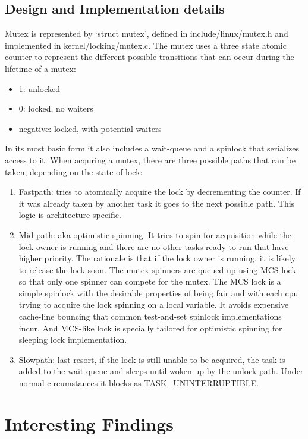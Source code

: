 \documentclass[10pt,preprint]{sigplanconf}
\begin{document}
\subsection{Design and Implementation details}
Mutex is represented by ‘struct mutex’, defined in include/linux/mutex.h and implemented in kernel/locking/mutex.c. The mutex uses a three state atomic counter to represent the different possible transitions that can occur during the lifetime of a mutex:
\begin{itemize}
	\item 1: unlocked
	\item 0: locked, no waiters
	\item negative: locked, with potential waiters
\end{itemize}
In its most basic form it also includes a wait-queue and a spinlock that serializes access to it. When acquring a mutex, there are three possible paths that can be taken, depending on the state of lock:
\begin{enumerate}
	\item Fastpath: tries to atomically acquire the lock by decrementing the counter. If it was already taken by another task it goes to the next possible path. This logic is architecture specific.
	\item Mid-path: aka optimistic spinning. It tries to spin for acquisition while the lock owner is running and there are no other tasks ready to run that have higher priority. The rationale is that if the lock owner is running, it is likely to release the lock soon. The mutex spinners are queued up using MCS lock so that only one spinner can compete for the mutex. The MCS lock is a simple spinlock with the desirable properties of being fair and with each cpu trying to acquire the lock spinning on a local variable. It avoids expensive cache-line bouncing that common test-and-set spinlock implementations incur. And MCS-like lock is specially tailored for optimistic spinning for sleeping lock implementation.
	\item Slowpath: last resort, if the lock is still unable to be acquired, the task is added to the wait-queue and sleeps until woken up by the unlock path. Under normal circumstances it blocks as TASK\_UNINTERRUPTIBLE.
\end{enumerate}

\newpage

\section{Interesting Findings}
\end{document}
